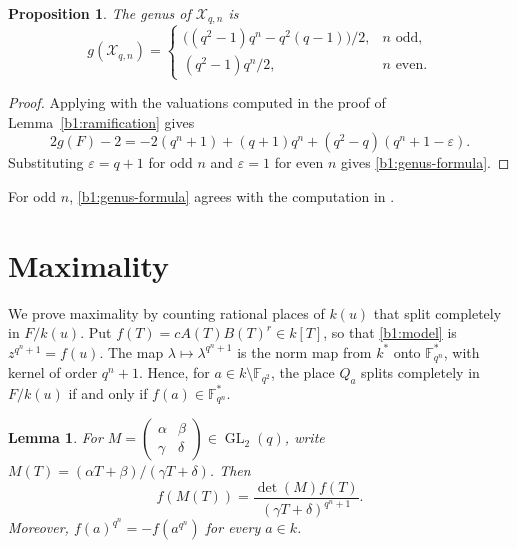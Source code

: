 \documentclass[10pt,a4paper]{amsart}
\numberwithin{equation}{section}
\newcommand{\F}{\mathbb F}
\DeclareMathOperator{\GL}{GL}
\newtheorem{proposition}[theorem]{Proposition}
\newtheorem{lemma}[theorem]{Lemma}
\begin{document}
\begin{proposition}
\label{b1:genus}
The genus of \(\mathcal X_{q,n}\) is
\begin{equation}
\label{b1:genus-formula}
 g(\mathcal X_{q,n})=
 \begin{cases}
 \bigl((q^2-1)q^n-q^2(q-1)\bigr)/2,&n\text{ odd},\\
 (q^2-1)q^n/2,&n\text{ even}.
 \end{cases}
\end{equation}
\end{proposition}

\begin{proof}
Applying \cite[Corollary~3.7.4]{Stichtenoth2009} with the valuations
computed in the proof of Lemma~\ref{b1:ramification} gives
\[
 2g(F)-2=-2(q^n+1)+(q+1)q^n+(q^2-q)(q^n+1-\varepsilon).
\]
Substituting \(\varepsilon=q+1\) for odd \(n\) and
\(\varepsilon=1\) for even \(n\) gives
\eqref{b1:genus-formula}.
\end{proof}

For odd \(n\), \eqref{b1:genus-formula} agrees with the computation in
\cite[Proposition~2.1]{BM2018}.


\section{Maximality}
\label{b1:maximality-section}

We prove maximality by counting rational places of \(k(u)\) that split
completely in \(F/k(u)\). Put \(f(T)=cA(T)B(T)^r\in k[T]\), so that
\eqref{b1:model} is \(z^{q^n+1}=f(u)\).
The map \(\lambda\mapsto\lambda^{q^n+1}\) is the norm map
from \(k^*\) onto \(\F_{q^n}^*\), with kernel of order \(q^n+1\).
Hence, for \(a\in k\setminus\F_{q^2}\), the place \(Q_a\) splits
completely in \(F/k(u)\) if and only if \(f(a)\in\F_{q^n}^*\).

\begin{lemma}
\label{b1:mobius-identities}
For \(M=\left(\begin{smallmatrix}\alpha&\beta\\\gamma&\delta\end{smallmatrix}\right)
\in\GL_2(q)\), write \(M(T)=(\alpha T+\beta)/(\gamma T+\delta)\).  Then
\begin{equation}
\label{b1:mobius-f}
 f(M(T))=\frac{\det(M)f(T)}{(\gamma T+\delta)^{q^n+1}}.
\end{equation}
Moreover, \(f(a)^{q^n}=-f(a^{q^n})\) for every \(a\in k\).
\end{lemma}
\end{document}
